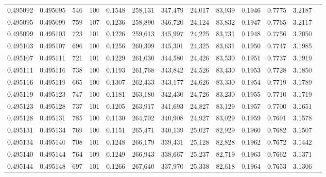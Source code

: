 \begin{tabular}{rrrrrrrrrrrrr}
0.495092 & 0.495095 &   546 & 100 &                                     0.1548 & 258,131 & 347,479 &  24,017 &  83,939 & 0.1946 & 0.7775 & 3.2187 \\
0.495095 & 0.495099 &   759 & 107 &                                     0.1236 & 258,890 & 346,720 &  24,124 &  83,832 & 0.1947 & 0.7765 & 3.2117 \\
0.495099 & 0.495103 &   723 & 101 &                                     0.1226 & 259,613 & 345,997 &  24,225 &  83,731 & 0.1948 & 0.7756 & 3.2050 \\
0.495103 & 0.495107 &   696 & 100 &                                     0.1256 & 260,309 & 345,301 &  24,325 &  83,631 & 0.1950 & 0.7747 & 3.1985 \\
0.495107 & 0.495111 &   721 & 101 &                                     0.1229 & 261,030 & 344,580 &  24,426 &  83,530 & 0.1951 & 0.7737 & 3.1919 \\
0.495111 & 0.495116 &   738 & 100 &                                     0.1193 & 261,768 & 343,842 &  24,526 &  83,430 & 0.1953 & 0.7728 & 3.1850 \\
0.495116 & 0.495119 &   665 & 100 &                                     0.1307 & 262,433 & 343,177 &  24,626 &  83,330 & 0.1954 & 0.7719 & 3.1789 \\
0.495119 & 0.495123 &   747 & 100 &                                     0.1181 & 263,180 & 342,430 &  24,726 &  83,230 & 0.1955 & 0.7710 & 3.1719 \\
0.495123 & 0.495128 &   737 & 101 &                                     0.1205 & 263,917 & 341,693 &  24,827 &  83,129 & 0.1957 & 0.7700 & 3.1651 \\
0.495128 & 0.495131 &   785 & 100 &                                     0.1130 & 264,702 & 340,908 &  24,927 &  83,029 & 0.1959 & 0.7691 & 3.1578 \\
0.495131 & 0.495134 &   769 & 100 &                                     0.1151 & 265,471 & 340,139 &  25,027 &  82,929 & 0.1960 & 0.7682 & 3.1507 \\
0.495134 & 0.495140 &   708 & 101 &                                     0.1248 & 266,179 & 339,431 &  25,128 &  82,828 & 0.1962 & 0.7672 & 3.1442 \\
0.495140 & 0.495144 &   764 & 109 &                                     0.1249 & 266,943 & 338,667 &  25,237 &  82,719 & 0.1963 & 0.7662 & 3.1371 \\
0.495144 & 0.495148 &   697 & 101 &                                     0.1266 & 267,640 & 337,970 &  25,338 &  82,618 & 0.1964 & 0.7653 & 3.1306 \\

\end{tabular}
